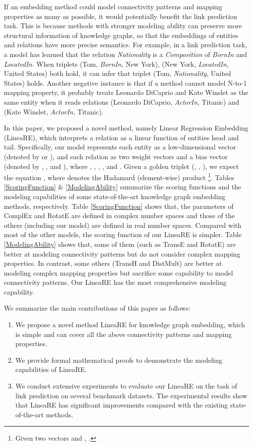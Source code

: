 \documentclass[conference]{IEEEtran}
\begin{document}
If an embedding method could model connectivity patterns and mapping properties as many as possible, it would potentially benefit the link prediction task. This is because methods with stronger modeling ability can preserve more structural information of knowledge graphs, so that the embeddings of entities and relations have more precise semantics. For example, in a link prediction task, a model has learned that the relation \textit{Nationality} is a \textit{Composition} of \textit{BornIn} and \textit{LocatedIn}. When triplets (Tom, \textit{BornIn}, New York), (New York, \textit{LocatedIn}, United States) both hold, it can infer that triplet (Tom, \textit{Nationality}, United States) holds. Another negative instance is that if a method cannot model N-to-1 mapping property, it probably treats Leonardo DiCaprio and Kate Winslet as the same entity when it reads relations (Leonardo DiCaprio, \textit{ActorIn}, Titanic) and (Kate Winslet, \textit{ActorIn}, Titanic).

In this paper, we proposed a novel method, namely Linear Regression Embedding (LineaRE), which interprets a relation as a linear function of entities head and tail. Specifically, our model represents each entity as a low-dimensional vector (denoted by  or ), and each relation as two weight vectors and a bias vector (denoted by , , and ), where , , , , and . Given a golden triplet (, , ), we expect the equation
,
where  denotes the Hadamard (element-wise) product
\footnote{
	Given two vectors  and , .
}. Tables \ref{ScoringFunction} \& \ref{ModelingAbility} summarize the scoring functions and the modeling capabilities of some state-of-the-art knowledge graph embedding methods, respectively. Table \ref{ScoringFunction} shows that, the parameters of ComplEx and RotatE are defined in complex number spaces and those of the others (including our model) are defined in real number spaces. Compared with most of the other models, the scoring function of our LineaRE is simpler. Table \ref{ModelingAbility} shows that, some of them (such as TransE and RotatE) are better at modeling connectivity patterns but do not consider complex mapping properties. In contrast, some others (TransH and DistMult) are better at modeling complex mapping properties but sacrifice some capability to model connectivity patterns. Our LineaRE has the most comprehensive modeling capability.

We summarize the main contributions of this paper as follows:
\begin{enumerate}
	\item We propose a novel method LineaRE for knowledge graph embedding, which is simple and can cover all the above connectivity patterns and mapping properties.
	\item We provide formal mathematical proofs to demonstrate the modeling capabilities of LineaRE.
	\item We conduct extensive experiments to evaluate our LineaRE on the task of link prediction on several benchmark datasets. The experimental results show that LineaRE has significant improvements compared with the existing state-of-the-art methods.
\end{enumerate}
\end{document}
